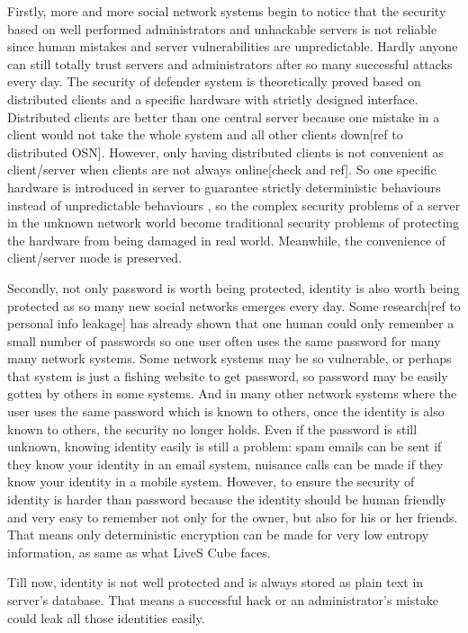 \documentclass[10pt,a4paper]{article}
\begin{document}
	Firstly, more and more social network systems
	begin to notice that the security based on well performed administrators and
	unhackable servers is not reliable since human mistakes and 
	server vulnerabilities are unpredictable. Hardly anyone can still totally 
	trust servers and administrators after so many successful attacks every day.
	The security of defender system is theoretically proved based on distributed
	clients and a specific hardware with strictly designed interface. Distributed 
	clients are better than one central server because one mistake in a client would not
	take the whole system and all other clients down[ref to distributed OSN]. 
	However, only having distributed clients is not convenient as client/server
	when clients are not always online[check and ref]. So
	one specific hardware is introduced in server to
	guarantee strictly deterministic behaviours instead of unpredictable behaviours
	, so the complex security problems of a server in the unknown network world
	become traditional security problems of protecting the hardware from being damaged in real world. Meanwhile,
	the convenience of client/server mode is preserved.
	
	Secondly, not only password is worth being protected, identity is also worth being protected as
	so many new social networks emerges every day. Some research[ref to personal info leakage] has already shown
	that one human could only remember a small number of passwords so one user often
	uses the same password for many many network systems. Some network systems may be
	so vulnerable, or perhaps that system is just a fishing website to get password, so
	password may be easily gotten by others in some systems. And in many other network
	systems where the user uses the same password which is known to others, 
	once the identity is also known to others,
	the security no longer holds. Even if the password is still unknown, knowing identity
	easily is still a problem: spam emails can be sent if they know your identity in an email system,
	nuisance calls can be made if they know your identity in a mobile system. However,
	to ensure the security of identity is harder than password because the identity should
	be human friendly and very easy to remember not only for the owner, but also for his or her friends.
	That means only deterministic encryption can be made for very low entropy information, as 
	same as what LiveS Cube faces.
	
	Till now, identity is not well protected and is always stored as plain text in server's database. That means
	a successful hack or an administrator's mistake could leak all those identities easily.
	
\end{document}
